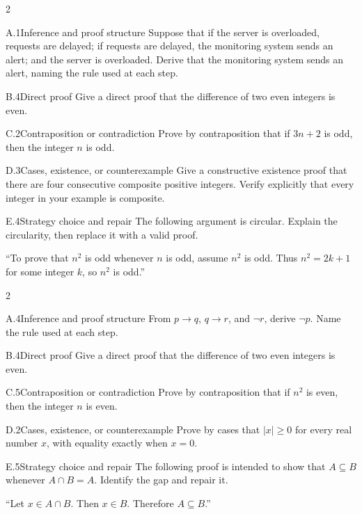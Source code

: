 \documentclass[9pt]{extarticle}
\begin{document}
\begin{multicols}{2}
\begin{CoreProblem}{A.1}{Inference and proof structure}
Suppose that if the server is overloaded, requests are delayed; if requests are
delayed, the monitoring system sends an alert; and the server is overloaded.
Derive that the monitoring system sends an alert, naming the rule used at each
step.
\end{CoreProblem}
\begin{CoreProblem}{B.4}{Direct proof}
Give a direct proof that the difference of two even integers is even.
\end{CoreProblem}
\begin{CoreProblem}{C.2}{Contraposition or contradiction}
Prove by contraposition that if $3n+2$ is odd, then the integer $n$ is odd.
\end{CoreProblem}
\columnbreak
\begin{CoreProblem}{D.3}{Cases, existence, or counterexample}
Give a constructive existence proof that there are four consecutive composite
positive integers. Verify explicitly that every integer in your example is
composite.
\end{CoreProblem}
\begin{CoreProblem}{E.4}{Strategy choice and repair}
The following argument is circular. Explain the circularity, then replace it with a valid proof.

``To prove that $n^2$ is odd whenever $n$ is odd, assume $n^2$ is odd. Thus
$n^2=2k+1$ for some integer $k$, so $n^2$ is odd.''
\end{CoreProblem}
\end{multicols}
\CoreWorkArea
\FormBreak
{}
\begin{multicols}{2}
\begin{CoreProblem}{A.4}{Inference and proof structure}
From $p\to q$, $q\to r$, and $\neg r$, derive $\neg p$. Name the rule used at
each step.
\end{CoreProblem}
\begin{CoreProblem}{B.4}{Direct proof}
Give a direct proof that the difference of two even integers is even.
\end{CoreProblem}
\begin{CoreProblem}{C.5}{Contraposition or contradiction}
Prove by contraposition that if $n^2$ is even, then the integer $n$ is even.
\end{CoreProblem}
\columnbreak
\begin{CoreProblem}{D.2}{Cases, existence, or counterexample}
Prove by cases that $|x|\ge 0$ for every real number $x$, with equality exactly when $x=0$.
\end{CoreProblem}
\begin{CoreProblem}{E.5}{Strategy choice and repair}
The following proof is intended to show that $A\subseteq B$ whenever
$A\cap B=A$. Identify the gap and repair it.

``Let $x\in A\cap B$. Then $x\in B$. Therefore $A\subseteq B$.''
\end{CoreProblem}
\end{multicols}
\end{document}
